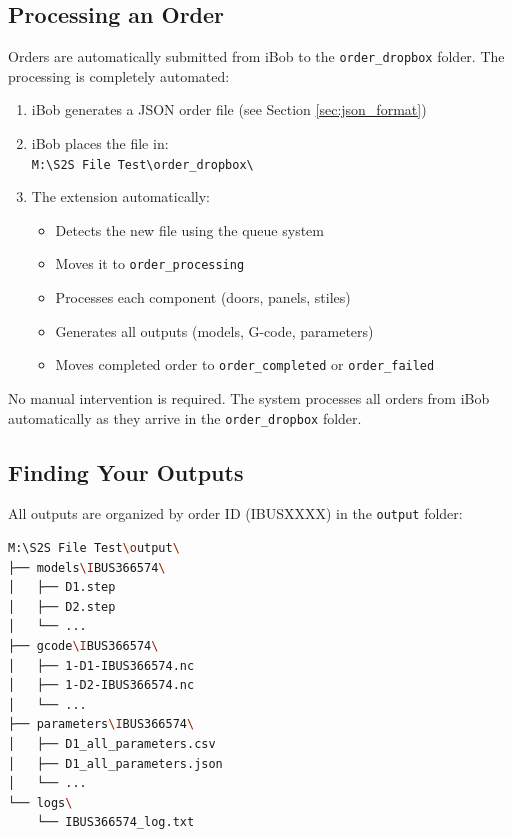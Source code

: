 \documentclass[11pt,letterpaper]{article}
\begin{document}
\subsection{Processing an Order}

Orders are automatically submitted from iBob to the \texttt{order\_dropbox} folder. The processing is completely automated:

\begin{enumerate}
    \item iBob generates a JSON order file (see Section \ref{sec:json_format})
    
    \item iBob places the file in:\\
    \texttt{M:\textbackslash S2S File Test\textbackslash order\_dropbox\textbackslash}
    
    \item The extension automatically:
    \begin{itemize}
        \item Detects the new file using the queue system
        \item Moves it to \texttt{order\_processing}
        \item Processes each component (doors, panels, stiles)
        \item Generates all outputs (models, G-code, parameters)
        \item Moves completed order to \texttt{order\_completed} or \texttt{order\_failed}
    \end{itemize}
\end{enumerate}

\begin{tcolorbox}[colback=yellow!5!white,colframe=orange!75!black,title=Note]
No manual intervention is required. The system processes all orders from iBob automatically as they arrive in the \texttt{order\_dropbox} folder.
\end{tcolorbox}

\subsection{Finding Your Outputs}

All outputs are organized by order ID (IBUSXXXX) in the \texttt{output} folder:

\begin{lstlisting}[language=bash]
M:\S2S File Test\output\
├── models\IBUS366574\
│   ├── D1.step
│   ├── D2.step
│   └── ...
├── gcode\IBUS366574\
│   ├── 1-D1-IBUS366574.nc
│   ├── 1-D2-IBUS366574.nc
│   └── ...
├── parameters\IBUS366574\
│   ├── D1_all_parameters.csv
│   ├── D1_all_parameters.json
│   └── ...
└── logs\
    └── IBUS366574_log.txt
\end{lstlisting}
\end{document}
